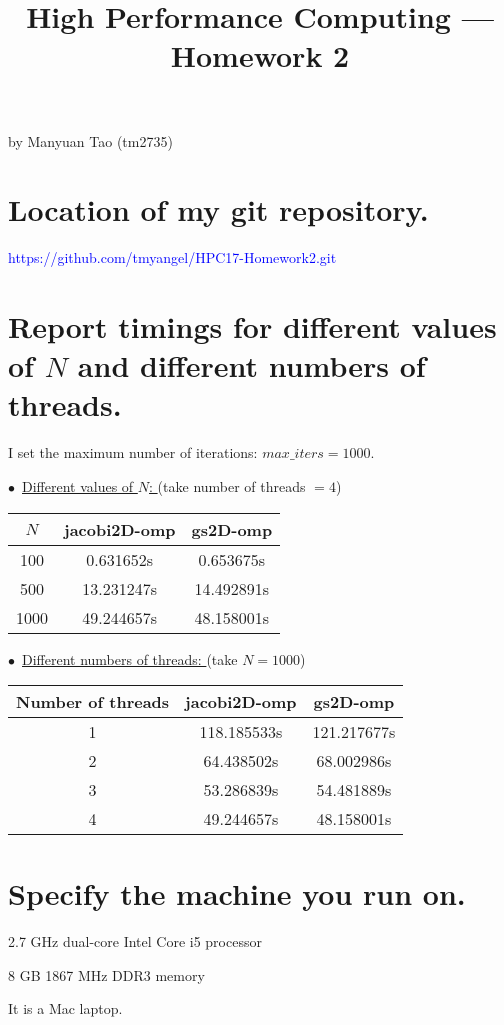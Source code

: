 \documentclass[a4paper,12pt]{article}
\title{\Large High Performance Computing --- Homework 2}
\begin{document}
\maketitle
\vspace{1em}
\begin{center}
{\large by {Manyuan Tao} (tm2735)}
\end{center}
\vspace{1em}

\section{Location of my git repository.}

\textcolor{blue}{https://github.com/tmyangel/HPC17-Homework2.git}

\vspace{3em}
\section{Report timings for different values of $N$ and different numbers of threads.}

I set the maximum number of iterations: $max\_iters=1000$.

$\bullet$\ \underline{Different values of $N$: } (take number of threads $=4$)

\vspace{6pt}
\begin{center}
\linespread{1.2}\selectfont
\begin{tabular}{|c|c|c|}
\hline
$N$ & jacobi2D-omp & gs2D-omp \\ \hline
100 & 0.631652s & 0.653675s \\ \hline
500 & 13.231247s & 14.492891s \\ \hline
1000 & 49.244657s & 48.158001s \\ \hline
\end{tabular}
\end{center}

\vspace{6pt}
$\bullet$\ \underline{Different numbers of threads: } (take $N=1000$)

\vspace{6pt}
\begin{center}
\linespread{1.2}\selectfont
\begin{tabular}{|c|c|c|}
\hline
Number of threads & jacobi2D-omp & gs2D-omp \\ \hline
1 & 118.185533s & 121.217677s \\ \hline
2 & 64.438502s & 68.002986s \\ \hline
3 & 53.286839s & 54.481889s \\ \hline
4 & 49.244657s & 48.158001s \\ \hline
\end{tabular}
\end{center}

\vspace{3em}
\section{Specify the machine you run on.}

2.7 GHz dual-core Intel Core i5 processor

8 GB 1867 MHz DDR3 memory

It is a Mac laptop.
\end{document}
